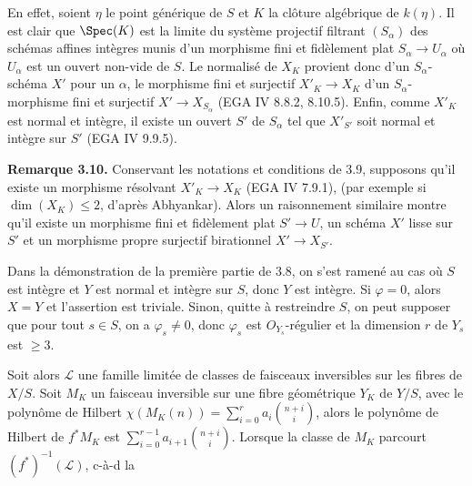 
En
effet, soient \(\eta\) le point g\'en\'erique de \(S\) et \(K\) la cl\^oture alg\'ebrique de \(k(\eta)\). Il est clair que \(\Spec(K)\) est la limite du syst\`eme projectif filtrant \((S_\alpha)\) des sch\'emas affines int\`egres munis d'un morphisme fini et fid\`element plat \(S_\alpha\to U_\alpha\) o\`u \(U_\alpha\) est un ouvert non-vide de \(S\). Le normalis\'e de \(X_K\) provient donc d'un \(S_\alpha\)-sch\'ema \(X'\) pour un \(\alpha\), le morphisme fini et surjectif \(X'_K\to X_K\) d'un \(S_\alpha\)-morphisme fini et surjectif \(X'\to X_{S_\alpha}\) (EGA IV 8.8.2, 8.10.5). Enfin, comme \(X'_K\) est normal et int\`egre, il existe un ouvert \(S'\) de \(S_\alpha\) tel que \(X'_{S'}\) soit normal et int\`egre sur \(S'\) (EGA IV 9.9.5).

\textbf{Remarque 3.10.} Conservant les notations et conditions de 3.9, supposons qu'il existe un morphisme r\'esolvant \(X'_K\to X_K\) (EGA IV 7.9.1), (par exemple si \(\dim(X_K)\le2\), d'apr\`es Abhyankar). Alors un raisonnement similaire montre qu'il existe un morphisme fini et fid\`element plat \(S'\to U\), un sch\'ema \(X'\) lisse sur \(S'\) et un morphisme propre surjectif birationnel \(X'\to X_{S'}\).

Dans la d\'emonstration de la premi\`ere partie de 3.8, on s'est ramen\'e au cas o\`u \(S\) est int\`egre et \(Y\) est normal et int\`egre sur \(S\), donc \(Y\) est int\`egre. Si \(\varphi=0\), alors \(X=Y\) et l'assertion est triviale. Sinon, quitte \`a restreindre \(S\), on peut supposer que pour tout \(s\in S\), on a \(\varphi_s\ne0\), donc \(\varphi_s\) est \({O}_{Y_s}\)-r\'egulier et la dimension \(r\) de \(Y_s\) est \(\ge3\).

Soit alors \(\mathcal L\) une famille limit\'ee de classes de faisceaux inversibles sur les fibres de \(X/S\). Soit \(M_K\) un faisceau inversible sur une fibre g\'eom\'etrique \(Y_K\) de \(Y/S\), avec le polyn\^ome de Hilbert \(\chi(M_K(n))=\sum_{i=0}^{r}a_i\binom{n+i}{i}\), alors le polyn\^ome de Hilbert de \(f^*M_K\) est \(\sum_{i=0}^{r-1}a_{i+1}\binom{n+i}{i}\). Lorsque la classe de \(M_K\) parcourt \((f^*)^{-1}(\mathcal L)\), c-\`a-d la
